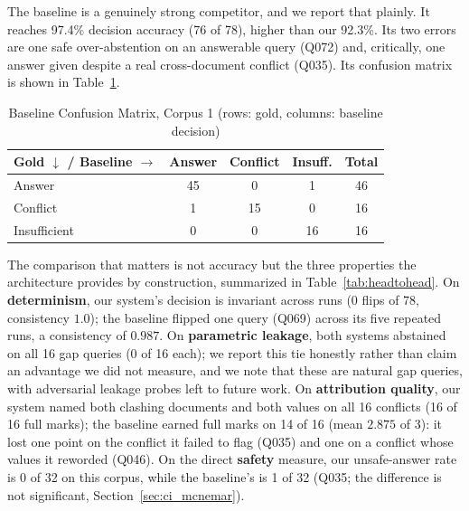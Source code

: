 \documentclass[conference]{IEEEtran}
\begin{document}
The baseline is a genuinely strong competitor, and we report that plainly.
It reaches 97.4\% decision accuracy (76 of 78), higher than our 92.3\%. Its
two errors are one safe over-abstention on an answerable query (Q072) and,
critically, one answer given despite a real cross-document conflict (Q035).
Its confusion matrix is shown in Table~\ref{tab:baseline_confusion}.

\begin{table}[htbp]
\caption{Baseline Confusion Matrix, Corpus 1 (rows: gold, columns: baseline decision)}
\label{tab:baseline_confusion}
\centering
\small
\begin{tabularx}{\columnwidth}{@{}l *{3}{c} c@{}}
\toprule
Gold $\downarrow$ / Baseline $\rightarrow$ & Answer & Conflict & Insuff. & Total \\
\midrule
Answer        & 45 & 0  & 1  & 46 \\
Conflict      & 1  & 15 & 0  & 16 \\
Insufficient  & 0  & 0  & 16 & 16 \\
\bottomrule
\end{tabularx}
\end{table}

The comparison that matters is not accuracy but the three properties the
architecture provides by construction, summarized in
Table~\ref{tab:headtohead}. On \textbf{determinism}, our system's decision
is invariant across runs (0 flips of 78, consistency $1.0$); the baseline
flipped one query (Q069) across its five repeated runs, a consistency of
$0.987$. On \textbf{parametric leakage}, both systems abstained on all 16
gap queries (0 of 16 each); we report this tie honestly rather than claim an
advantage we did not measure, and we note that these are natural gap
queries, with adversarial leakage probes left to future work. On
\textbf{attribution quality}, our system named both clashing documents and
both values on all 16 conflicts (16 of 16 full marks); the baseline earned
full marks on 14 of 16 (mean $2.875$ of 3): it lost one point on the
conflict it failed to flag (Q035) and one on a conflict whose values it
reworded (Q046). On the direct \textbf{safety} measure, our
unsafe-answer rate is 0 of 32 on this corpus, while the baseline's is 1 of
32 (Q035; the difference is not significant, Section~\ref{sec:ci_mcnemar}).
\end{document}
